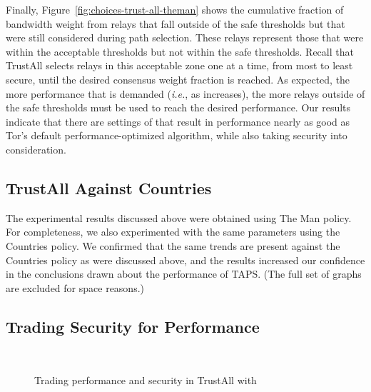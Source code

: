 \documentclass[conference]{styles/IEEEtran}
\newcommand{\ie}{\emph{i.e.}}
\newcommand{\ps}{TAPS\xspace}
\begin{document}
Finally, Figure~\ref{fig:choices-trust-all-theman} shows the cumulative fraction
of bandwidth weight from relays that fall outside of the safe thresholds but
that were still considered during path selection. These relays represent those
that were within the acceptable thresholds but not within the safe thresholds.
Recall that TrustAll selects relays in this acceptable zone one at a time, from most
to least secure, until the desired consensus weight fraction  is
reached. As expected, the more performance that is demanded (\ie{}, as
 increases), the more relays outside of the safe thresholds must be
used to reach the desired performance. Our results indicate that there are settings
of  that result in performance nearly as good as Tor's default
performance-optimized algorithm, while also taking security into consideration.

\subsection{TrustAll Against \textsf{Countries}}

The experimental results discussed above were obtained using \textsf{The Man} policy. For
completeness, we also experimented with the same parameters using the \textsf{Countries}
policy.
We confirmed that the same trends are present against the \textsf{Countries} policy as were
discussed above, and the results increased our confidence in the conclusions drawn about
the performance of \ps. (The full set of graphs are excluded for space reasons.)

\subsection{Trading Security for Performance}

\begin{figure}[t]
    \centering
    \vspace{-2mm}
    \\
    \vspace{-2mm}
    \caption{\small Trading performance and security in TrustAll with }
    \vspace{-4mm}
    \label{fig:tradeoffs}
\end{figure}
\end{document}
